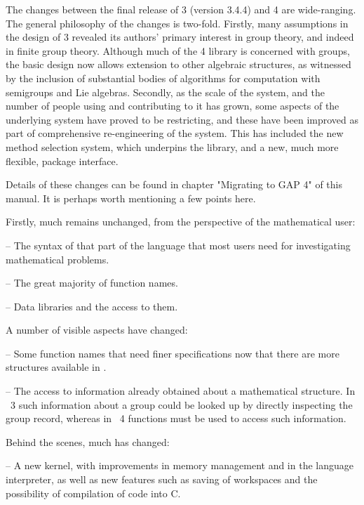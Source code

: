 The changes between the final release of {\GAP} 3 (version 3.4.4) and
{\GAP} 4 are  wide-ranging.  The general philosophy of the
changes is two-fold.  Firstly, many assumptions in the design of
{\GAP} 3 revealed its authors' primary interest in group theory, and
indeed in finite group theory. Although much of the {\GAP} 4 library
is concerned with groups, the basic design now allows extension to
other algebraic structures, as witnessed by the inclusion of
substantial bodies of algorithms for computation with semigroups and
Lie algebras.  Secondly, as the scale of the system, and the number of
people using and contributing to it has grown, some aspects of the
underlying system have proved to be restricting, and these have been
improved as part of comprehensive re-engineering of the system. This
has included the new method selection system, which underpins the
library, and a new, much more flexible, {\GAP} package interface.

Details of these changes can be found in chapter "Migrating to GAP 4" of
this manual. It is perhaps worth mentioning a few points here. 

Firstly, much remains unchanged, from the perspective of the mathematical 
user:

\beginlist%
  \item{--}
    The syntax of that part  of the {\GAP} language  that most users need
    for investigating mathematical problems.

  \item{--}
    The great majority of function names.

  \item{--}
    Data libraries and the access to them.
\endlist

A number of visible aspects have changed:

\beginlist%
  \item{--}
    Some function names that need finer specifications now that there are
    more structures available in {\GAP}.

  \item{--}  
    The    access to information   already  obtained about a mathematical
    structure. In {\GAP}~3 such information about a group could be looked
    up  by  directly inspecting  the  group record,  whereas in  {\GAP}~4
    functions must be used to access such information.
\endlist

Behind the scenes, much has changed: 

\beginlist%
  \item{--} A new kernel,  with improvements in  memory management  and in
  the language interpreter, as well  as new  features  such as saving  of
  workspaces and the possibility of compilation of {\GAP} code into C.

